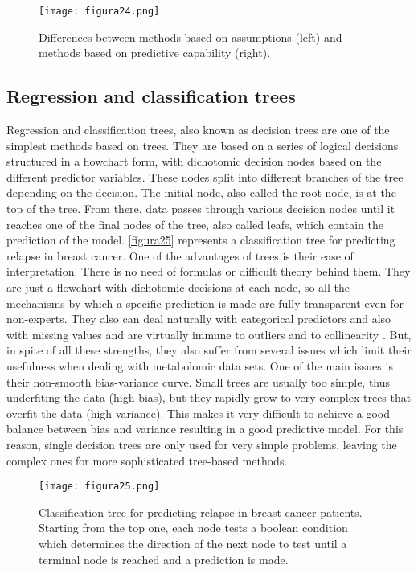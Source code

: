 \begin{figure}[hbtp]
\centering
\texttt{[image: figura24.png]}
\caption[Differences between methods based on assumptions and methods based on predictive capability]{Differences between methods based on assumptions (left) and methods based on predictive capability (right).}
\label{figura24}
\end{figure}

\subsection{Regression and classification trees}
\label{decisiontrees}
Regression and classification trees, also known as decision trees are one of the simplest methods based on trees. They are based on a series of logical decisions structured in a flowchart form, with dichotomic decision nodes based on the different predictor variables. These nodes split into different branches of the tree depending on the decision. The initial node, also called the root node, is at the top of the tree. From there, data passes through various decision nodes until it reaches one of the final nodes of the tree, also called leafs, which contain the prediction of the model. \autoref{figura25} represents a classification tree for predicting relapse in breast cancer. One of the advantages of trees is their ease of interpretation. There is no need of formulas or difficult theory behind them. They are just a flowchart with dichotomic decisions at each node, so all the mechanisms by which a specific prediction is made are fully transparent even for non-experts. They also can deal naturally with categorical predictors and also with missing values and are virtually immune to outliers \parencite{venables2002tree} and to collinearity \parencite{loh2014fifty}. But, in spite of all these strengths, they also suffer from several issues which limit their usefulness when dealing with metabolomic data sets. One of the main issues is their non-smooth bias-variance curve. Small trees are usually too simple, thus underfiting the data (high bias), but they rapidly grow to very complex trees that overfit the data (high variance). This makes it very difficult to achieve a good balance between bias and variance resulting in a good predictive model. For this reason, single decision trees are only used for very simple problems, leaving the complex ones for more sophisticated tree-based methods.

\begin{figure}[hbtp]
\centering
\texttt{[image: figura25.png]}
\caption[Classification tree for predicting relapse in breast cancer patients]{Classification tree for predicting relapse in breast cancer patients. Starting from the top one, each node tests a boolean condition which determines the direction of the next node to test until a terminal node is reached and a prediction is made.}
\label{figura25}
\end{figure}

